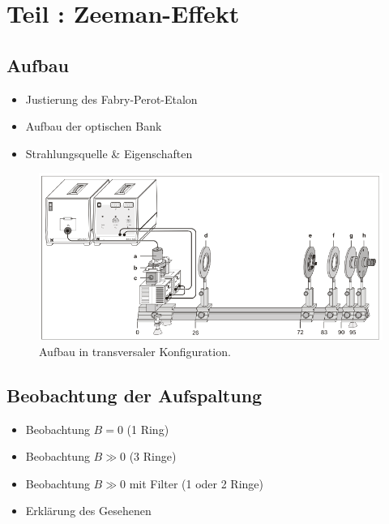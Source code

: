 \section{Teil : Zeeman-Effekt}


\subsection{Aufbau}
    \begin{itemize}
        \item Justierung des Fabry-Perot-Etalon
        \item Aufbau der optischen Bank
        \item Strahlungsquelle \& Eigenschaften
    \end{itemize}
    
    \begin{figure}[H]
        \centering
        \includegraphics[width=0.65\linewidth]{figs/Zeeman_Aufbau.png}
        \caption{Aufbau in transversaler Konfiguration. \cite{Zeemann-Effekt_LD-Handblätter}}
    \end{figure}




\subsection{Beobachtung der Aufspaltung}
    \begin{itemize}
        \item Beobachtung $B = 0$ (1 Ring)
        \item Beobachtung $B \gg 0$ (3 Ringe)
        \item Beobachtung $B \gg 0$ mit Filter (1 oder 2 Ringe)
        \item Erklärung des Gesehenen
    \end{itemize}


